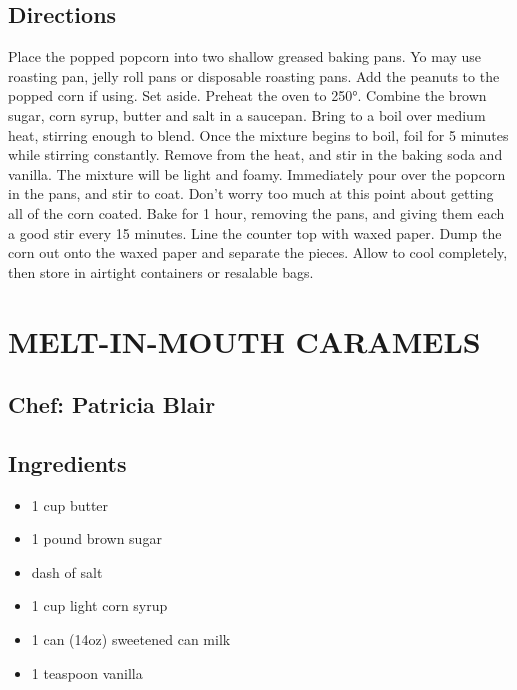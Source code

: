 \documentclass[
]{book}
\providecommand{\tightlist}{%
  \setlength{\itemsep}{0pt}\setlength{\parskip}{0pt}}
\begin{document}
\hypertarget{directions-100}{%
\subsection*{Directions}\label{directions-100}}


Place the popped popcorn into two shallow greased baking pans. Yo may use roasting pan, jelly roll pans or disposable roasting pans. Add the peanuts to the popped corn if using. Set aside. Preheat the oven to 250°. Combine the brown sugar, corn syrup, butter and salt in a saucepan. Bring to a boil over medium heat, stirring enough to blend. Once the mixture begins to boil, foil for 5 minutes while stirring constantly. Remove from the heat, and stir in the baking soda and vanilla. The mixture will be light and foamy. Immediately pour over the popcorn in the pans, and stir to coat. Don't worry too much at this point about getting all of the corn coated. Bake for 1 hour, removing the pans, and giving them each a good stir every 15 minutes. Line the counter top with waxed paper. Dump the corn out onto the waxed paper and separate the pieces. Allow to cool completely, then store in airtight containers or resalable bags.

\hypertarget{melt-in-mouth-caramels}{%
\section*{MELT-IN-MOUTH CARAMELS}\label{melt-in-mouth-caramels}}


\hypertarget{chef-patricia-blair-16}{%
\subsection*{Chef: Patricia Blair}\label{chef-patricia-blair-16}}


\hypertarget{ingredients-101}{%
\subsection*{Ingredients}\label{ingredients-101}}


\begin{itemize}
\tightlist
\item
  1 cup butter
\item
  1 pound brown sugar
\item
  dash of salt
\item
  1 cup light corn syrup\\
\item
  1 can (14oz) sweetened can milk
\item
  1 teaspoon vanilla
\end{itemize}
\end{document}

